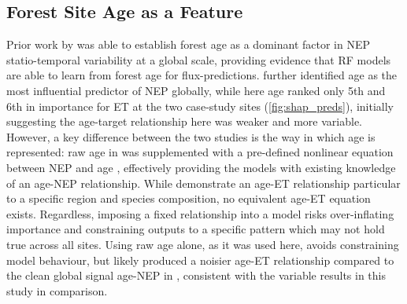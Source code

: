\subsection{Forest Site Age as a Feature}
Prior work by \textcite{besnard2018} was able to establish forest age as a dominant factor in \ac{NEP} statio-temporal variability at a global scale, providing evidence that \ac{RF} models are able to learn from forest age for flux-predictions.  \textcite{besnard2018} further identified age as the most influential predictor of \ac{NEP} globally, while here age ranked only 5th and 6th in importance for ET at the two case‑study sites (\autoref{fig:shap_preds}), initially suggesting the age-target relationship here was weaker and more variable. However, a key difference between the two studies is the way in which age is represented: raw age in \textcite{besnard2018} was supplemented with a pre-defined nonlinear equation between \ac{NEP} and age \parencite{amiro2010ecosystem}, effectively providing the models with existing knowledge of an age-NEP relationship. While \textcite{oishi2020} demonstrate an age-ET relationship particular to a specific region and species composition, no equivalent age-ET equation exists. Regardless, imposing a fixed relationship into a model risks over-inflating importance and constraining outputs to a specific pattern which may not hold true across all sites. Using raw age alone, as it was used here, avoids constraining model behaviour, but likely produced a noisier age-ET relationship compared to the clean global signal age-NEP in \textcite{besnard2018}, consistent with the variable results in this study in comparison.


